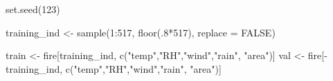 \documentclass[
]{article}
\newenvironment{Shaded}{\begin{snugshade}}{\end{snugshade}}
\newcommand{\AttributeTok}[1]{\textcolor[rgb]{0.77,0.63,0.00}{#1}}
\newcommand{\ConstantTok}[1]{\textcolor[rgb]{0.00,0.00,0.00}{#1}}
\newcommand{\DecValTok}[1]{\textcolor[rgb]{0.00,0.00,0.81}{#1}}
\newcommand{\FunctionTok}[1]{\textcolor[rgb]{0.00,0.00,0.00}{#1}}
\newcommand{\NormalTok}[1]{#1}
\newcommand{\OtherTok}[1]{\textcolor[rgb]{0.56,0.35,0.01}{#1}}
\newcommand{\SpecialCharTok}[1]{\textcolor[rgb]{0.00,0.00,0.00}{#1}}
\newcommand{\StringTok}[1]{\textcolor[rgb]{0.31,0.60,0.02}{#1}}
\begin{document}
\begin{Shaded}
\begin{Highlighting}[]
\FunctionTok{set.seed}\NormalTok{(}\DecValTok{123}\NormalTok{)}

\NormalTok{training\_ind }\OtherTok{\textless{}{-}} \FunctionTok{sample}\NormalTok{(}\DecValTok{1}\SpecialCharTok{:}\DecValTok{517}\NormalTok{, }\FunctionTok{floor}\NormalTok{(.}\DecValTok{8}\SpecialCharTok{*}\DecValTok{517}\NormalTok{), }\AttributeTok{replace =} \ConstantTok{FALSE}\NormalTok{)}

\NormalTok{train }\OtherTok{\textless{}{-}}\NormalTok{ fire[training\_ind, }\FunctionTok{c}\NormalTok{(}\StringTok{"temp"}\NormalTok{,}\StringTok{"RH"}\NormalTok{,}\StringTok{"wind"}\NormalTok{,}\StringTok{"rain"}\NormalTok{, }\StringTok{"area"}\NormalTok{)]}
\NormalTok{val }\OtherTok{\textless{}{-}}\NormalTok{ fire[}\SpecialCharTok{{-}}\NormalTok{training\_ind, }\FunctionTok{c}\NormalTok{(}\StringTok{"temp"}\NormalTok{,}\StringTok{"RH"}\NormalTok{,}\StringTok{"wind"}\NormalTok{,}\StringTok{"rain"}\NormalTok{, }\StringTok{"area"}\NormalTok{)]}


\end{Highlighting}
\end{Shaded}
\end{document}
